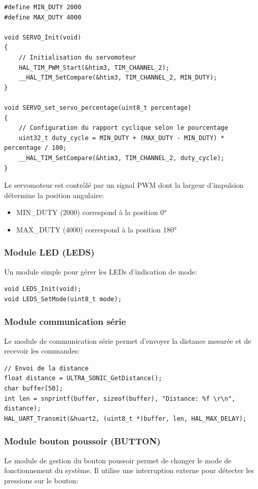 \begin{lstlisting}[caption={Module servomoteur}, label={lst:servomodule}]
#define MIN_DUTY 2000
#define MAX_DUTY 4000

void SERVO_Init(void)
{
    // Initialisation du servomoteur
    HAL_TIM_PWM_Start(&htim3, TIM_CHANNEL_2);
    __HAL_TIM_SetCompare(&htim3, TIM_CHANNEL_2, MIN_DUTY);
}

void SERVO_set_servo_percentage(uint8_t percentage)
{
    // Configuration du rapport cyclique selon le pourcentage
    uint32_t duty_cycle = MIN_DUTY + (MAX_DUTY - MIN_DUTY) * percentage / 100;
    __HAL_TIM_SetCompare(&htim3, TIM_CHANNEL_2, duty_cycle);
}
\end{lstlisting}

Le servomoteur est contrôlé par un signal PWM dont la largeur d'impulsion détermine la position angulaire:
\begin{itemize}
    \item MIN\_DUTY (2000) correspond à la position 0°
    \item MAX\_DUTY (4000) correspond à la position 180°
\end{itemize}

\subsubsection{Module LED (LEDS)}
Un module simple pour gérer les LEDs d'indication de mode:

\begin{lstlisting}[caption={Interface du module LED}, label={lst:ledmodule}]
void LEDS_Init(void);
void LEDS_SetMode(uint8_t mode);
\end{lstlisting}

\subsubsection{Module communication série}
Le module de communication série permet d'envoyer la distance mesurée et de recevoir les commandes:

\begin{lstlisting}[caption={Exemple de communication série}, label={lst:serialcomm}]
// Envoi de la distance
float distance = ULTRA_SONIC_GetDistance();
char buffer[50];
int len = snprintf(buffer, sizeof(buffer), "Distance: %f \r\n", distance);
HAL_UART_Transmit(&huart2, (uint8_t *)buffer, len, HAL_MAX_DELAY);
\end{lstlisting}

\subsubsection{Module bouton poussoir (BUTTON)}
Le module de gestion du bouton poussoir permet de changer le mode de fonctionnement du système. Il utilise une interruption externe pour détecter les pressions sur le bouton:


